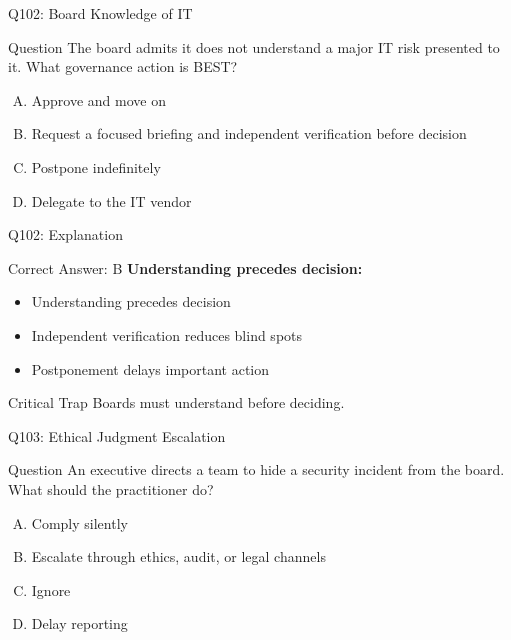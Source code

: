\documentclass{beamer}
\begin{document}
	\begin{frame}{Q102: Board Knowledge of IT}
		\begin{block}{Question}
			The board admits it does not understand a major IT risk presented to it. What governance action is BEST?
		\end{block}
		\begin{enumerate}[(A)]
			\item Approve and move on
			\item Request a focused briefing and independent verification before decision
			\item Postpone indefinitely
			\item Delegate to the IT vendor
		\end{enumerate}
	\end{frame}
	
	\begin{frame}{Q102: Explanation}
		\begin{block}{Correct Answer: B}
			\textbf{Understanding precedes decision:}
			\begin{itemize}
				\item Understanding precedes decision
				\item Independent verification reduces blind spots
				\item Postponement delays important action
			\end{itemize}
		\end{block}
		\begin{alertblock}{Critical Trap}
			Boards must understand before deciding.
		\end{alertblock}
	\end{frame}
	
	\begin{frame}{Q103: Ethical Judgment Escalation}
		\begin{block}{Question}
			An executive directs a team to hide a security incident from the board. What should the practitioner do?
		\end{block}
		\begin{enumerate}[(A)]
			\item Comply silently
			\item Escalate through ethics, audit, or legal channels
			\item Ignore
			\item Delay reporting
		\end{enumerate}
	\end{frame}
	
\end{document}
